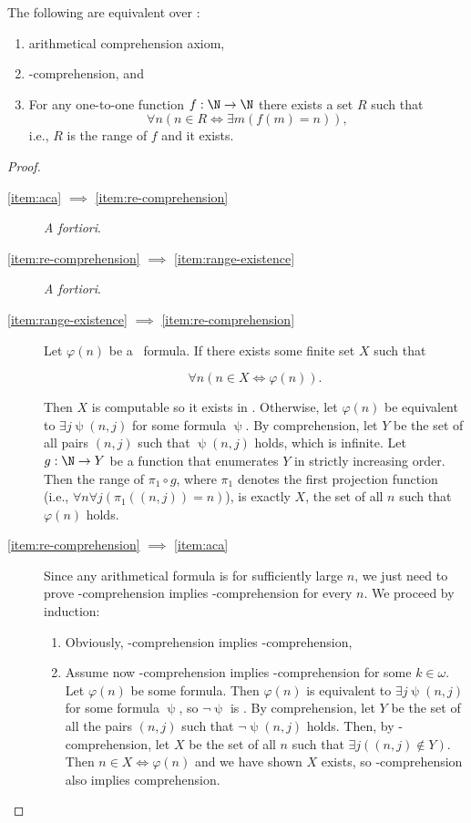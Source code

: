 \documentclass[../main.tex]{memoir}
\begin{document}
\begin{lemma}
  \label{lemma:aca-equivalences}
  The following are equivalent over \rca:

  \begin{enumerate}
  \item \label{item:aca} arithmetical comprehension axiom,
  \item \label{item:re-comprehension} \re-comprehension, and
  \item \label{item:range-existence} For any one-to-one function $f: \N \to \N$ there exists a set $R$ such that
    \[ \forall n (n \in R \iff \exists m (f(m) = n)), \]
    i.e., $R$ is the range of $f$ and it exists.
  \end{enumerate}
\end{lemma}
\begin{proof}
  \begin{description}
  \item[\ref{item:aca} $\implies$ \ref{item:re-comprehension}] \textit{A fortiori}.
  \item[\ref{item:re-comprehension} $\implies$ \ref{item:range-existence}] \textit{A fortiori}.
  \item[\ref{item:range-existence} $\implies$ \ref{item:re-comprehension}]
    Let $\varphi(n)$ be a \re\ formula. If there exists some finite set $X$ such that

    \[ \forall n (n \in X \iff \varphi(n)). \]

    Then $X$ is computable so it exists in \rca. Otherwise, let $\varphi(n)$ be equivalent to $\exists j \uppsi(n, j)$ for some  formula $\uppsi$. By  comprehension, let $Y$ be the set of all pairs $(n, j)$ such that $\uppsi(n, j)$ holds, which is infinite. Let $g: \N \to Y$ be a function that enumerates $Y$ in strictly increasing order. Then the range of $\pi_1 \circ g$, where $\pi_1$ denotes the first projection function (i.e., $\forall n \forall j (\pi_1((n, j)) = n)$), is exactly $X$, the set of all $n$ such that $\varphi(n)$ holds.
  \item[\ref{item:re-comprehension} $\implies$ \ref{item:aca}] Since any arithmetical formula is  for sufficiently large $n$, we just need to prove \re-comprehension implies -comprehension for every $n$. We proceed by induction:

    \begin{enumerate}
    \item Obviously, \re-comprehension implies -comprehension,
    \item Assume now \re-comprehension implies -comprehension for some $k \in \omega$. Let $\varphi(n)$ be some  formula. Then $\varphi(n)$ is equivalent to $\exists j \uppsi(n, j)$ for some  formula $\uppsi$, so $\neg \uppsi$ is . By  comprehension, let $Y$ be the set of all the pairs $(n, j)$ such that $\neg \uppsi(n, j)$ holds. Then, by \re-comprehension, let $X$ be the set of all $n$ such that $\exists j ((n, j) \not\in Y)$. Then $n \in X \iff \varphi(n)$ and we have shown $X$ exists, so \re-comprehension also implies  comprehension.
    \end{enumerate}


\end{description}
\end{proof}
\end{document}
